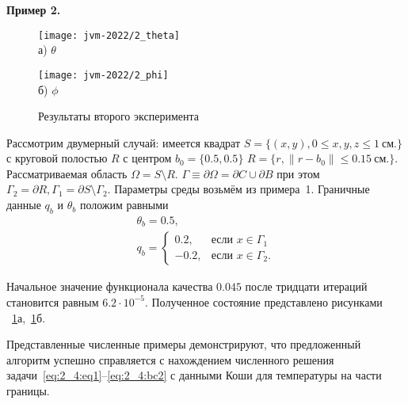 \textbf{Пример 2.}
\begin{figure}[h!t]
    \begin{minipage}[b][][b]{0.49\linewidth}
        \centering
        \texttt{[image: jvm-2022/2\_theta]}
        \\ а) $\theta$
    \end{minipage}
    \hfill
    \begin{minipage}[b][][b]{0.49\linewidth}
        \centering
        \texttt{[image: jvm-2022/2\_phi]}
        \\ б) $\phi$
    \end{minipage}
    \caption{Результаты второго эксперимента}
    \label{fig:4_4:6}
\end{figure}
Рассмотрим двумерный случай: имеется квадрат
$S = \{(x, y), 0 \leq x,y,z \leq 1~\text{см.}\}$ с
круговой полостью $R$ с центром $b_0 =\{0.5, 0.5\}$
$R = \{r, \| r - b_0 \| \leq 0.15~\text{см.} \}$.
Рассматриваемая область $\Omega = S \setminus R$.
$\Gamma \equiv \partial \Omega = \partial C \cup \partial B$ при этом
$ \Gamma_2 = \partial R, \Gamma_1 = \partial S \setminus \Gamma_2$.
Параметры среды возьмём из примера~1.
Граничные данные $q_b$ и $\theta_b$ положим равными
\begin{gather*}
    \theta_b = 0.5, \\
    q_b =
    \begin{cases}
        0.2, & \text{если } x \in \Gamma_1 \\
        -0.2, & \text{если } x \in \Gamma_2.
    \end{cases}
\end{gather*}

Начальное значение функционала качества $0.045$
после тридцати итераций становится равным $6.2\cdot10^{-5}$.
Полученное состояние представлено рисунками ~\ref{fig:4_4:6}а,~\ref{fig:4_4:6}б.


Представленные численные примеры демонстрируют,
что предложенный алгоритм успешно справляется
с нахождением численного решения задачи~\eqref{eq:2_4:eq1}--\eqref{eq:2_4:bc2}
с данными Коши для температуры на части границы.
